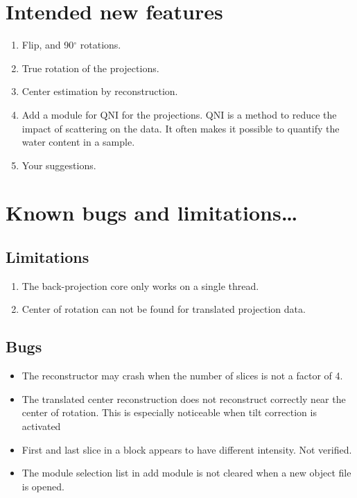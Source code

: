 \documentclass[a4paper]{scrreprt}
\begin{document}
\chapter{Intended new features}
\begin{enumerate}
\item Flip, and 90$^{\circ}$ rotations.
\item True rotation of the projections.
\item Center estimation by reconstruction.
\item Add a module for QNI for the projections. QNI is a method to reduce the impact of scattering on the data. It often makes it possible to quantify the water content in a sample.
\item Your suggestions.
\end{enumerate}

\chapter{Known bugs and limitations\ldots}
\section{Limitations}
\begin{enumerate}
\item The back-projection core only works on a single thread.
\item Center of rotation can not be found for translated projection data.
\end{enumerate}
\section{Bugs}
\begin{itemize}
\item The reconstructor may crash when the number of slices is not a factor of 4. 
\item The translated center reconstruction does not reconstruct correctly near the center of rotation.
This is especially noticeable when tilt correction is activated
\item First and last slice in a block appears to have different intensity. Not verified.
\item The module selection list in add module is not cleared when a new object file is opened.
\end{itemize}
\end{document}
